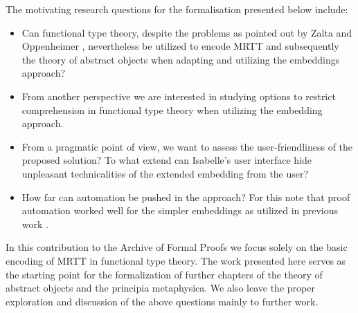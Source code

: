 \begin{isabellebody}
\begin{isamarkuptext}
  The motivating research questions for the formalisation presented below include:
  \begin{itemize} 
  \item Can functional type theory, despite the problems as pointed 
   out by Zalta and
   Oppenheimer \cite{zalta11:_relat_versus_funct_found_logic}, 
   nevertheless be utilized to encode MRTT and subsequently the theory of abstract 
   objects when adapting and utilizing the embeddings approach? 
  \item From another perspective we are interested in studying options to restrict comprehension in 
   functional type theory when utilizing the embedding approach.
  \item From a pragmatic point of view, we want to assess the user-friendliness of 
   the proposed solution? 
   To what extend can Isabelle's  user interface hide 
   unpleasant technicalities of the extended embedding from the user?
  \item How far can automation be pushed in the approach? For this note that proof automation 
    worked  well for the simpler embeddings as utilized in previous work \cite{C40,C55}. 
  \end{itemize}

  In this contribution to the Archive of Formal Proofs we focus solely on the basic 
  encoding of MRTT in functional type theory. The work presented here serves as the starting point for
  the formalization of further chapters of the theory of abstract objects and the principia 
  metaphysica. We also leave the proper exploration and discussion of the above questions 
  mainly to further work. 


\end{isamarkuptext}
\end{isabellebody}
